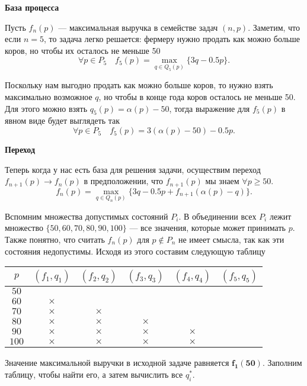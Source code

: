 \bigskip

\textbf{База процесса}

Пусть $f_n(p)$ --- максимальная выручка в семействе задач $(n, p)$. Заметим, что если $n = 5$, то задача легко решается: фермеру нужно продать как можно больше коров, но чтобы их осталось не меньше 50
\[
\forall p \in P_5 \quad f_5(p) = \max_{q \in Q_5(p)} \{3q - 0.5p\}.
\]

Поскольку нам выгодно продать как можно больше коров, то нужно взять максимально возможное $q$, но чтобы в конце года коров осталось не меньше 50. Для этого можно взять $q_5(p) = \alpha(p) - 50$, тогда выражение для $f_5(p)$ в явном виде будет выглядеть так
\[
\forall p \in P_5 \quad f_5(p) = 3(\alpha(p) - 50) - 0.5p.
\]

\bigskip

\textbf{Переход}

Теперь когда у нас есть база для решения задачи, осуществим переход $f_{n+1}(p) \to f_n(p)$ в предположении, что $f_{n+1}(p)$ мы знаем $\forall p \ge 50$.
\[
\boxed{f_n(p) = \max_{q \in Q_n(p)} \Big\{3q - 0.5p + f_{n + 1}(\alpha(p) - q)\Big\}}.\tag{**}
\]

Вспомним множества допустимых состояний $P_i$. В объединении всех $P_i$ лежит множество $\{50, 60, 70, 80, 90, 100\}$ --- все значения, которые может принимать $p$. Также понятно, что считать $f_n(p)$ для $p \notin P_n$ не имеет смысла, так как эти состояния недопустимы. Исходя из этого составим следующую таблицу

\begin{table}[H]
	\centering
	\begin{tabular}{ | c | c | c | c | c | c | } 
		\hline
		$p$ & $(f_1, q_1)$ & $(f_2, q_2)$ & $(f_3, q_3)$ & $(f_4, q_4)$ & $(f_5, q_5)$ \\ 
		\hline
		$50$ & & & & & \\\hline
		$60$ & $\times$ & & & & \\\hline
		$70$ & $\times$ & $\times$ & & & \\\hline
		$80$ & $\times$ & $\times$ & $\times$ & & \\\hline
		$90$ & $\times$ & $\times$ & $\times$ & $\times$ & \\\hline
		$100$ & $\times$ & $\times$ & $\times$ & $\times$ & \\\hline
	\end{tabular}
\end{table}

Значение максимальной выручки в исходной задаче равняется $\mathbf {f_1(50)}$. Заполним таблицу, чтобы найти его, а затем вычислить все $q^*_i$.

